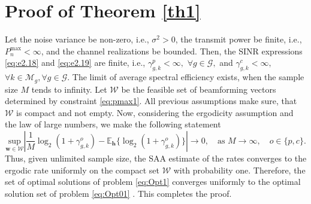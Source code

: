 \documentclass[12pt,draftcls,onecolumn]{IEEEtran}
\theoremstyle{remark}
\theoremstyle{definition}
\begin{document}
{\section{Proof of Theorem \ref{th1}} \label{app1}
Let the noise variance be non-zero, i.e., $\sigma^2 > 0$, the transmit power be finite, i.e., $P_n^{\text{max}} < \infty$, and the channel realizations be bounded. Then, the SINR expressions \eqref{eq:e2.18} and \eqref{eq:e2.19} are finite, i.e., $\gamma_{g,k}^p < \infty,$ $\forall g\in\mathcal{G},$ and $\gamma_{g,k}^c < \infty,$ $\forall k \in \mathcal{M}_g, \forall g \in \mathcal{G}$. The limit of average spectral efficiency exists, when the sample size $M$ tends to infinity. Let $\mathcal{W}$ be the feasible set of beamforming vectors determined by constraint \eqref{eq:pmax1}. All previous assumptions make sure, that $\mathcal{W}$ is compact and not empty. Now, considering the ergodicity assumption and the law of large numbers, we make the following statement \cite[Theorem 7.48]{saa}
\begin{equation}
	\underset{\mathbf{w}\in\mathcal{W}}{\text{sup}} \left| \frac{1}{M} \log_2(1+\gamma_{g,k}^o) - \mathbb{E}_\mathbf{h}\{ \log_2(1+\gamma_{g,k}^o) \} \right| \rightarrow 0, \quad \text{as } M \rightarrow \infty, \quad o\in\{p,c\}.
\end{equation}
Thus, given unlimited sample size, the SAA estimate of the rates converges to the ergodic rate uniformly on the compact set $\mathcal{W}$ with probability one. Therefore, the set of optimal solutions of problem \eqref{eq:Opt1} converges uniformly to the optimal solution set of problem \eqref{eq:Opt01} \cite[Theorem 5.3]{saa}. This completes the proof.
}
\end{document}
